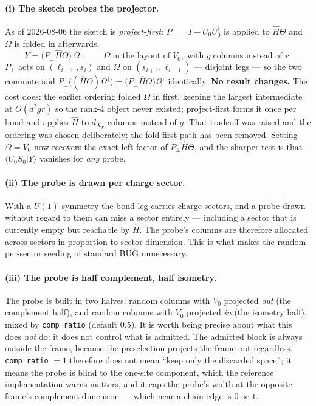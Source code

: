 \documentclass[11pt,a4paper]{article}
\newcommand{\Hb}{\hat{H}}
\newcommand{\Theb}{\Theta}
\newcommand{\Om}{\Omega}
\newcommand{\code}[1]{\texttt{\small #1}}
\begin{document}
\paragraph{(i) The sketch probes the projector.} As of 2026-08-06 the sketch is
\emph{project-first}: $P_\perp = I - U_0U_0^\dagger$ is applied to $\Hb\Theb$ and $\Om$ is
folded in afterwards,
\begin{equation}
  Y = \big(P_\perp \Hb\Theb\big)\,\Om^\dagger,
  \qquad
  \Om \;\text{in the layout of}\; V_0,\;\text{with } g \;\text{columns instead of } r .
\end{equation}
$P_\perp$ acts on $(\ell_{i-1},s_i)$ and $\Om$ on $(s_{i+1},\ell_{i+1})$ --- disjoint legs ---
so the two commute and $P_\perp\big((\Hb\Theb)\Om^\dagger\big)=\big(P_\perp\Hb\Theb\big)\Om^\dagger$
identically. \textbf{No result changes.} The cost does: the earlier ordering folded $\Om$ in
first, keeping the largest intermediate at $O(d^2 g r)$ so the rank-4 object never existed;
project-first forms it once per bond and applies $\Hb$ to $d\chi_r$ columns instead of $g$.
That tradeoff was raised and the ordering was chosen deliberately; the fold-first path has been
removed. Setting $\Om = V_0$ now recovers the exact left factor of $P_\perp\Hb\Theb$, and the
sharper test is that $\langle U_0S_0 | Y\rangle$ vanishes for \emph{any} probe.

\paragraph{(ii) The probe is drawn per charge sector.} With a $U(1)$ symmetry the bond leg
carries charge sectors, and a probe drawn without regard to them can miss a sector entirely ---
including a sector that is currently empty but reachable by $\Hb$. The probe's columns are
therefore allocated across sectors in proportion to sector dimension. This is what makes the
random per-sector seeding of standard BUG unnecessary.

\paragraph{(iii) The probe is half complement, half isometry.} The probe is built in two halves:
random columns with $V_0$ projected \emph{out} (the complement half), and random columns with
$V_0$ projected \emph{in} (the isometry half), mixed by \code{comp\_ratio} (default $0.5$). It
is worth being precise about what this does \emph{not} do: it does not control what is admitted.
The admitted block is always outside the frame, because the preselection projects the frame out
regardless. \code{comp\_ratio} $=1$ therefore does not mean ``keep only the discarded space'';
it means the probe is blind to the one-site component, which the reference implementation warns
matters, and it caps the probe's width at the opposite frame's complement dimension --- which
near a chain edge is $0$ or $1$.
\end{document}
